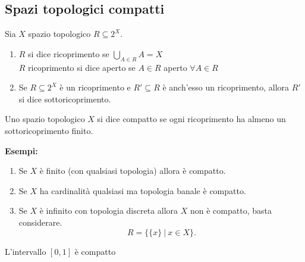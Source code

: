 \documentclass[12px]{article}
\begin{document}
 \subsection{Spazi topologici compatti}
\begin{defi}
	Sia $X$ spazio topologico $R\subseteq 2^X$.
	\begin{enumerate}
		\item $R$ si dice ricoprimento se $ \bigcup^{}_{A\in R}A = X$ \\
		$R$ ricoprimento si dice aperto se $A\in R$ aperto  $\forall A\in R$ 
	\item Se $R\subseteq 2^X$ è un ricoprimento e  $R'\subseteq R$ è anch'esso un ricoprimento, allora  $R'$ si dice sottoricoprimento.
	\end{enumerate}
\end{defi}
\begin{defi}
	Uno spazio topologico $X$ si dice compatto se ogni ricoprimento ha almeno un sottoricoprimento finito.
\end{defi}
\textbf{Esempi:}\\
\begin{enumerate}
	\item Se  $X$ è finito (con qualsiasi topologia) allora è compatto.
	\item Se $X$ ha cardinalità qualsiasi ma topologia banale è compatto.
	\item Se $X$ è infinito con topologia discreta allora $X$ non è compatto, basta considerare.
		\[
			R = \{\{x\}\ | \ x\in X\}
		.\] 
\end{enumerate}
\begin{teo}
	L'intervallo $[0,1]$ è compatto
\end{teo}
\end{document}
